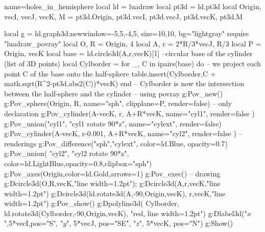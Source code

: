 \begin{luadraw}{name=holes_in_hemisphere}
local ld = luadraw
local pt3d = ld.pt3d
local Origin, vecI, vecJ, vecK, M = pt3d.Origin, pt3d.vecI, pt3d.vecJ, pt3d.vecK, pt3d.M

local g = ld.graph3d:new{window={-5,5,-4,5}, size={10,10}, bg="lightgray"}
require "luadraw_povray"
local O, R = Origin, 4
local A, r = 2*R/3*vecJ, R/3
local P = {Origin, vecK}
local base = ld.circle3d(A,r,vecK)[1] --circular base of the cylinder (list of 3D points)
local Cylborder = {}
for _, C in ipairs(base) do -- we project each point C of the base onto the half-sphere
    table.insert(Cylborder,C + math.sqrt(R^2-pt3d.abs2(C))*vecK)
end -- Cylborder is now the intersection between the half-sphere and the cylinder
-- using povray 
g:Pov_new()
g:Pov_sphere(Origin, R, {name="sph", clipplane=P, render=false}) -- only declaration
g:Pov_cylinder(A-vecK, r, A+R*vecK, {name="cyl1", render=false })
g:Pov_union({"cyl1", "cyl1 rotate 90*z"}, {name="cylext", render=false})
g:Pov_cylinder(A-vecK, r-0.001, A+R*vecK, {name="cyl2", render=false }) 
-- renderings
g:Pov_difference({"sph","cylext"}, {color=ld.Blue, opacity=0.7})
g:Pov_union( {"cyl2", "cyl2 rotate 90*z"}, {color=ld.LightBlue,opacity=0.8,clipbox="sph"})
g:Pov_axes(Origin,{color=ld.Gold,arrows=1})
g:Pov_exec()
-- drawing
g:Dcircle3d(O,R,vecK,"line width=1.2pt"); g:Dcircle3d(A,r,vecK,"line width=1.2pt")
g:Dcircle3d(ld.rotate3d(A,-90,{Origin,vecK}), r,vecK,"line width=1.2pt")
g:Pov_show()
g:Dpolyline3d( {Cylborder, ld.rotate3d(Cylborder,-90,{Origin,vecK})}, "red, line width=1.2pt")
g:Dlabel3d("$x$",5*vecI,{pos="S"}, "$y$", 5*vecJ, {pos="SE"}, "$z$", 5*vecK, {pos="N"})
g:Show()
\end{luadraw}
